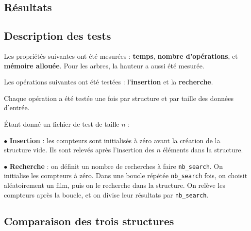 \documentclass[a4paper, 12pt, twoside]{article}
\begin{document}
    \begin{indt}{\section{Résultats}} %
        \begin{indt}{\subsection{Description des tests}} %
            Les propriétés suivantes ont été mesurées : \textbf{temps}, \textbf{nombre d'opérations}, et \textbf{mémoire allouée}.
            Pour les arbres, la hauteur a aussi été mesurée.

            Les opérations suivantes ont été testées : l'\textbf{insertion} et la \textbf{recherche}.

            Chaque opération a été testée une fois par structure et par taille des données d'entrée.

            \vspace{12pt}

            \'Etant donné un fichier de test de taille $n$ :
            
            $\bullet$ \textbf{Insertion} : les compteurs sont initialisés à zéro avant la création de la structure vide.
            Ils sont relevés après l'insertion des $n$ éléments dans la structure.

            $\bullet$ \textbf{Recherche} : on définit un nombre de recherches à faire \texttt{nb\_search}. On initialise les compteurs à zéro.
            Dans une boucle répétée \texttt{nb\_search} fois, on choisit aléatoirement un film, puis on le recherche dans la structure.
            On relève les compteurs après la boucle, et on divise leur résultats par \texttt{nb\_search}.
        \end{indt} %

        \begin{indt}{\subsection{Comparaison des trois structures}} %
            \label{sub:all_comp}

            \begin{figure}[H]
                \centering
            

\end{figure}
\end{indt}
\end{indt}
\end{document}

